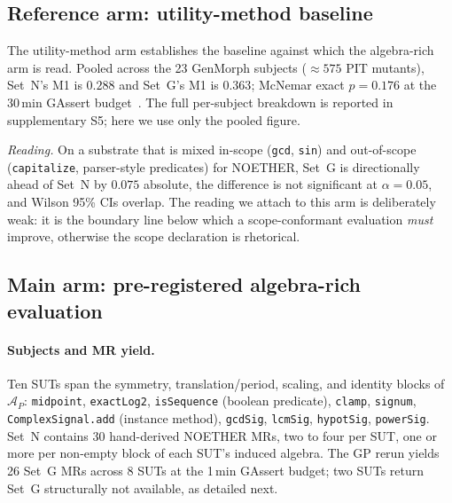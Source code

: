 \subsection{Reference arm: utility-method baseline}
\label{subsec:utility-arm}

The utility-method arm establishes the baseline against which the
algebra-rich arm is read. Pooled across the 23 GenMorph subjects
($\approx 575$ PIT mutants), Set~N's M1 is $0.288$ and Set~G's M1 is
$0.363$; McNemar exact $p = 0.176$ at the 30\,min GAssert
budget~\cite{Ayerdi2023GenMorph}. The full per-subject breakdown is
reported in supplementary S5; here we use only the pooled figure.

\textit{Reading.} On a substrate that is mixed in-scope (\texttt{gcd},
\texttt{sin}) and out-of-scope (\texttt{capitalize}, parser-style
predicates) for NOETHER, Set~G is directionally ahead of Set~N by
$0.075$ absolute, the difference is not significant at $\alpha=0.05$,
and Wilson 95\% CIs overlap. The reading we attach to this arm is
deliberately weak: it is the boundary line below which a
scope-conformant evaluation \emph{must} improve, otherwise the scope
declaration is rhetorical.

\subsection{Main arm: pre-registered algebra-rich evaluation}
\label{subsec:algebra-rich-arm}

\paragraph{Subjects and MR yield.}
Ten SUTs span the symmetry, translation/period, scaling, and
identity blocks of $\mathcal{A}_P$: \texttt{midpoint},
\texttt{exactLog2}, \texttt{isSequence} (boolean predicate),
\texttt{clamp}, \texttt{signum}, \texttt{ComplexSignal.add} (instance
method), \texttt{gcdSig}, \texttt{lcmSig}, \texttt{hypotSig},
\texttt{powerSig}. Set~N contains 30 hand-derived NOETHER MRs, two to
four per SUT, one or more per non-empty block of each SUT's induced
algebra. The GP rerun yields 26 Set~G MRs across 8 SUTs at the 1\,min
GAssert budget; two SUTs return Set~G structurally not available, as
detailed next.

